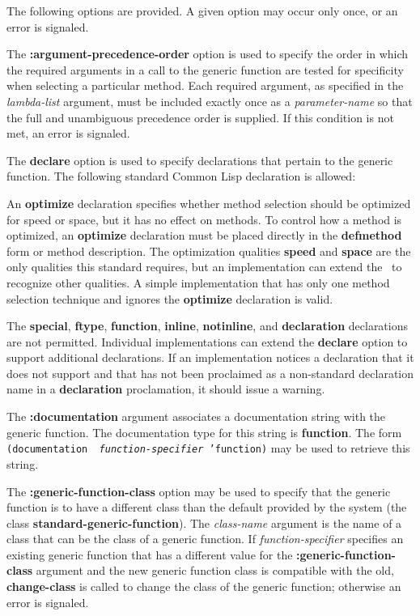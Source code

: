 The following options are provided.  A given option may occur only once,
or an error is signaled.

\beginlist
 
\item{\bull} 
The {\bf :argument-precedence-order} option is used to specify the
order in which the required arguments in a call to the generic
function are tested for specificity when selecting a particular
method.  Each required argument, as specified in the {\it lambda-list\/}
argument, must be included exactly once as a {\it
parameter-name} so that the full and unambiguous precedence order is
supplied.  If this condition is not met, an error is signaled.

\item{\bull}
The {\bf declare} option is used to specify declarations that pertain
to the generic function.  The following standard Common Lisp
declaration is allowed:

\itemitem{--}
An {\bf optimize} declaration specifies whether method selection
should be optimized for speed or space, but it has no effect on
methods.  To control how a method is optimized, an {\bf optimize}
declaration must be placed directly in the {\bf defmethod} form or
method description.  The optimization qualities {\bf speed} and {\bf
space} are the only qualities this standard requires, but an
implementation can extend the \CLOS\ to recognize other qualities.  A
simple implementation that has only one method selection technique and
ignores the {\bf optimize} declaration is valid.

\item{}
The {\bf special}, {\bf ftype}, {\bf function}, {\bf inline}, {\bf
notinline}, and {\bf declaration} declarations are not permitted.
Individual implementations can extend the {\bf declare} option to
support additional declarations.  If an implementation notices a
declaration that it does not support and that has not been proclaimed
as a non-standard declaration name in a {\bf declaration} proclamation, it
should issue a warning.

\item{\bull} 
The {\bf :documentation} argument associates a documentation string
with the generic function.  The documentation type for this string is
{\bf function}.  The form {\tt (documentation {\it
function-specifier\/} 'function)} may be used to retrieve this
string.

\item{\bull} 
The {\bf :generic-function-class} option may be used to specify that
the generic function is to have a different class than the default
provided by the system (the class {\bf standard-generic-function}).
The {\it class-name\/} argument is the name of a class that can be the
class of a generic function.  If {\it function-specifier\/} specifies
an existing generic function that has a different value for the {\bf
:generic-function-class} argument and the new generic function class
is compatible with the old, {\bf change-class} is called to change the
class of the generic function; otherwise an error is signaled.

